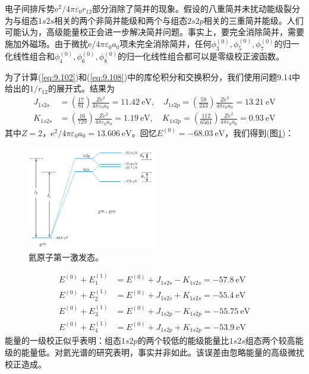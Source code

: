     电子间排斥势$\mathrm{e}^2/4\pi\varepsilon_0 r_{12}$部分消除了简并的现象。假设的八重简并未扰动能级裂分为与组态$1s2s$相关的两个非简并能级和两个与组态$2s2p$相关的三重简并能级。人们可能认为，高级能量校正会进一步解决简并问题。事实上，要完全消除简并，需要施加外磁场。由于微扰$\mathrm{e}/4\pi\varepsilon_0a_0$项未完全消除简并，任何$\phi_3^{\left(0\right)},\phi_5^{\left(0\right)},\phi_7^{\left(0\right)}$的归一化线性组合和$\phi_4^{\left(0\right)},\phi_6^{\left(0\right)},\phi_8^{\left(0\right)}$的归一化线性组合都可以是零级校正波函数。

    为了计算(\ref{eq:9.102})和(\ref{eq:9.108})中的库伦积分和交换积分，我们使用问题9.14中给出的$1/r_{12}$的展开式。结果为
    \begin{equation}
        \begin{aligned}
            J_{1s2s} &= \left( \frac{17}{81} \right) \frac{Ze^2}{4\pi \varepsilon_0 a_0} = 11.42 \:\mathrm{eV}, \quad J_{1s2p} = \left( \frac{59}{243} \right) \frac{Ze^2}{4\pi \varepsilon_0 a_0} = 13.21 \:\mathrm{eV} \\
            K_{1s2s} &= \left(\frac{16}{729}\right) \frac{Ze^2}{4\pi \varepsilon_0 a_0} = 1.19 \:\mathrm{eV}, \quad K_{1s2p} = \left(\frac{112}{6561}\right) \frac{Ze^2}{4\pi \varepsilon_0 a_0} = 0.93\:\mathrm{eV}
        \end{aligned}
        \label{eq:9.111}
    \end{equation}
    其中$Z=2$，$\mathrm{e}^2/4\pi\varepsilon_0 a_0 = 13.606 \:\mathrm{eV}$。回忆$E^{\left(0\right)} = -68.03 \:\mathrm{eV}$，我们得到(图\ref{fig:9.3})：
    \begin{figure}[h!]
        \centering
        \includegraphics[width=0.5\textwidth]{Figures/9.3.png}
        \caption{氦原子第一激发态。}
        \label{fig:9.3}
    \end{figure}
    \begin{equation*}
        \begin{aligned}
            E^{(0)} + E_1^{(1)} &= E^{(0)} + J_{1s2s} - K_{1s2s} = -57.8 \:\mathrm{eV} \\
            E^{(0)} + E_2^{(1)} &= E^{(0)} + J_{1s2s} + K_{1s2s} = -55.4 \:\mathrm{eV} \\
            E^{(0)} + E_3^{(1)} &= E^{(0)} + J_{1s2p} - K_{1s2p} = -55.75 \:\mathrm{eV} \\
            E^{(0)} + E_4^{(1)} &= E^{(0)} + J_{1s2p} + K_{1s2p} = -53.9 \:\mathrm{eV}
        \end{aligned}
    \end{equation*}
    能量的一级校正似乎表明：组态$1s2p$的两个较低的能级能量比$1s2s$组态两个较高能级的能量低。对氦光谱的研究表明，事实并非如此。该误差由忽略能量的高级微扰校正造成。

